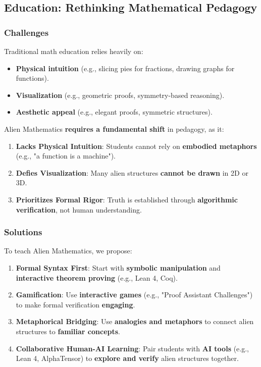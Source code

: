 \documentclass[11pt, a4paper]{article}
\begin{document}
\subsection{Education: Rethinking Mathematical Pedagogy}
\subsubsection{Challenges}
Traditional math education relies heavily on:
\begin{itemize}
    \item \textbf{Physical intuition} (e.g., slicing pies for fractions, drawing graphs for functions).
    \item \textbf{Visualization} (e.g., geometric proofs, symmetry-based reasoning).
    \item \textbf{Aesthetic appeal} (e.g., elegant proofs, symmetric structures).
\end{itemize}

Alien Mathematics \textbf{requires a fundamental shift} in pedagogy, as it:
\begin{enumerate}
    \item \textbf{Lacks Physical Intuition}: Students cannot rely on \textbf{embodied metaphors} (e.g., "a function is a machine").
    \item \textbf{Defies Visualization}: Many alien structures \textbf{cannot be drawn} in 2D or 3D.
    \item \textbf{Prioritizes Formal Rigor}: Truth is established through \textbf{algorithmic verification}, not human understanding.
\end{enumerate}

\subsubsection{Solutions}
To teach Alien Mathematics, we propose:
\begin{enumerate}
    \item \textbf{Formal Syntax First}: Start with \textbf{symbolic manipulation} and \textbf{interactive theorem proving} (e.g., Lean 4, Coq).
    \item \textbf{Gamification}: Use \textbf{interactive games} (e.g., "Proof Assistant Challenges") to make formal verification \textbf{engaging}.
    \item \textbf{Metaphorical Bridging}: Use \textbf{analogies and metaphors} to connect alien structures to \textbf{familiar concepts}.
    \item \textbf{Collaborative Human-AI Learning}: Pair students with \textbf{AI tools} (e.g., Lean 4, AlphaTensor) to \textbf{explore and verify} alien structures together.
\end{enumerate}
\end{document}
